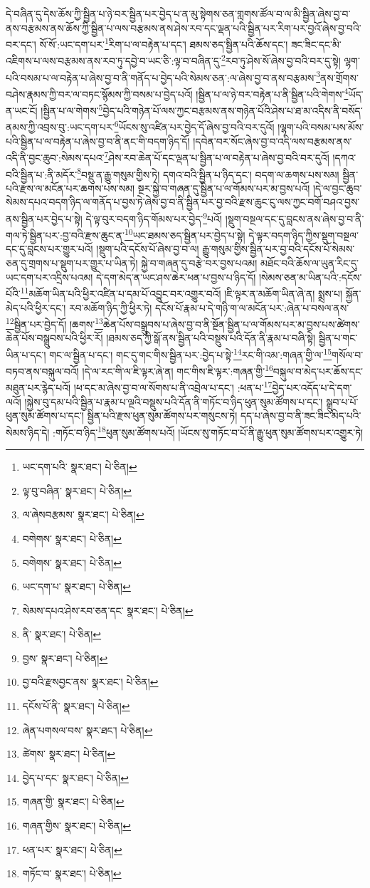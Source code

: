 དེ་བཞིན་དུ་དེས་ཆོས་ཀྱི་སྦྱིན་པ་ཉེ་བར་སྦྱིན་པར་བྱེད་པ་ན་མུ་སྟེགས་ཅན་གླགས་ཚོལ་བ་ལ་མི་སྦྱིན་ཞེས་བྱ་བ་ནས་བརྩམས་ནས་ཆོས་ཀྱི་སྦྱིན་པ་ལས་བརྩམས་ནས་ཤེས་རབ་དང་ལྡན་པའི་སྦྱིན་པར་རིག་པར་བྱའོ་ཞེས་བྱ་བའི་བར་དང་། སོ་སོ་:ཡང་དག་པར་\footnote{ཡང་དག་པའི་  སྣར་ཐང་།  པེ་ཅིན། }རིག་པ་ལ་བརྟེན་པ་དང་། ཐམས་ཅད་སྦྱིན་པའི་ཆོས་དང་། ཟང་ཟིང་དང་མི་འཇིགས་པ་ལས་བརྩམས་ནས་རབ་ཏུ་དབྱེ་བ་ཡང་ཅི་:ལྟ་བ་བཞིན་དུ་\footnote{ལྟ་བུ་བཞིན་  སྣར་ཐང་།  པེ་ཅིན། }རབ་ཏུ་ཤེས་སོ་ཞེས་བྱ་བའི་བར་དུ་སྟེ། ལྷག་པའི་བསམ་པ་ལ་བརྟེན་པ་ཞེས་བྱ་བ་ནི་གནོད་པ་བྱེད་པའི་སེམས་ཅན་:ལ་ཞེས་བྱ་བ་ནས་བརྩམས་\footnote{ལ་ཞེསབརྩམས་  སྣར་ཐང་།  པེ་ཅིན། }ནས་གྲོགས་བཤེས་རྣམས་ཀྱི་བར་ལ་བཏང་སྙོམས་ཀྱི་བསམ་པ་བྱེད་པའོ། །སྦྱིན་པ་ལ་ཉེ་བར་བརྟེན་པ་ནི་སྦྱིན་པའི་གེགས་\footnote{བགེགས་  སྣར་ཐང་།  པེ་ཅིན། }ཡོད་ན་ཡང་ངོ། །སྦྱིན་པ་ལ་གེགས་\footnote{བགེགས་  སྣར་ཐང་།  པེ་ཅིན། }བྱེད་པའི་གཉེན་པོ་ལས་ཀྱང་བརྩམས་ནས་གཉེན་པོའི་ཤེས་པ་ཐ་མ་འདིས་ནི་བསོད་ནམས་ཀྱི་འབྲས་བུ་:ཡང་དག་པར་\footnote{ཡང་དག་པ་  སྣར་ཐང་།  པེ་ཅིན། }ཡོངས་སུ་འཛིན་པར་བྱེད་དོ་ཞེས་བྱ་བའི་བར་དུའོ། །ལྷག་པའི་བསམ་པས་མོས་པའི་སྦྱིན་པ་ལ་བརྟེན་པ་ཞེས་བྱ་བ་ནི་ནང་གི་བདག་ཉིད་དོ། །དབེན་བར་སོང་ཞེས་བྱ་བ་འདི་ལས་བརྩམས་ནས་འདི་ནི་བྱང་ཆུབ་:སེམས་དཔའ་\footnote{སེམས་དཔའ་ཤེས་རབ་ཅན་དང་  སྣར་ཐང་།  པེ་ཅིན། }ཤེས་རབ་ཆེན་པོ་དང་ལྡན་པ་སྦྱིན་པ་ལ་བརྟེན་པ་ཞེས་བྱ་བའི་བར་དུའོ། །དཀའ་བའི་སྦྱིན་པ་:ནི་མདོར་\footnote{ནི་  སྣར་ཐང་།  པེ་ཅིན། }བསྡུ་ན་རྒྱུ་གསུམ་གྱིས་ཏེ། དགའ་བའི་སྦྱིན་པ་ཉིད་དང་། བདག་ལ་ཆགས་པས་སམ། སྦྱིན་པའི་རྫས་ལ་མངོན་པར་ཆགས་པས་སམ། སྔར་སྐྱེ་བ་གཞན་དུ་སྦྱིན་པ་ལ་གོམས་པར་མ་བྱས་པའོ། །དེ་ལ་བྱང་ཆུབ་སེམས་དཔའ་བདག་ཉིད་ལ་གནོད་པ་བྱས་ཏེ་ཞེས་བྱ་བ་ནི་སྦྱིན་པར་བྱ་བའི་རྫས་ཆུང་ངུ་ལས་ཀྱང་བགོ་བཤའ་བྱས་ནས་སྦྱིན་པར་བྱེད་པ་སྟེ། དེ་ལྟ་བུར་བདག་ཉིད་གོམས་པར་བྱེད་\footnote{བྱས་  སྣར་ཐང་།  པེ་ཅིན། }པའོ། །སྡུག་བསྔལ་དང་དུ་བླངས་ནས་ཞེས་བྱ་བ་ནི་གལ་ཏེ་སྦྱིན་པར་:བྱ་བའི་རྫས་ཆུང་ན་\footnote{བྱ་བའི་རྫསབྱང་ནས་  སྣར་ཐང་།  པེ་ཅིན། }ཡང་ཐམས་ཅད་སྦྱིན་པར་བྱེད་པ་སྟེ། དེ་ལྟར་བདག་ཉིད་ཀྱིས་སྡུག་བསྔལ་དང་དུ་བླངས་པར་གྱུར་པའོ། །སྡུག་པའི་དངོས་པོ་ཞེས་བྱ་བ་ལ། རྒྱུ་གསུམ་གྱིས་སྦྱིན་པར་བྱ་བའི་དངོས་པོ་སེམས་ཅན་དུ་གྲགས་པ་སྡུག་པར་གྱུར་པ་ཡིན་ཏེ། སྐྱེ་བ་གཞན་དུ་བརྩེ་བར་བྱས་པའམ། མཐོང་བའི་ཆོས་ལ་ཡུན་རིང་དུ་ཡང་དག་པར་འདྲིས་པའམ། དེ་དག་མེད་ན་ཡང་ཤས་ཆེར་ཕན་པ་བྱས་པ་ཉིད་དོ། །སེམས་ཅན་མ་ཡིན་པའི་:དངོས་པོའི་\footnote{དངོས་པོ་ནི་  སྣར་ཐང་།  པེ་ཅིན། }མཆོག་ཡིན་པའི་ཕྱིར་འཛིན་པ་དམ་པོ་འབྱུང་བར་འགྱུར་བའོ། །ཇི་ལྟར་ན་མཆོག་ཡིན་ཞེ་ན། སྨྲས་པ། སྐྱོན་མེད་པའི་ཕྱིར་དང་། རབ་མཆོག་ཉིད་ཀྱི་ཕྱིར་ཏེ། དངོས་པོ་རྣམ་པ་དེ་གཉི་ག་ལ་མངོན་པར་:ཞེན་པ་བསལ་ནས་\footnote{ཞེན་པགསལ་བས་  སྣར་ཐང་།  པེ་ཅིན། }སྦྱིན་པར་བྱེད་དོ། །ཆགས་\footnote{ཚེགས་  སྣར་ཐང་།  པེ་ཅིན། }ཆེན་པོས་བསྒྲུབས་པ་ཞེས་བྱ་བ་ནི་སྔོན་སྦྱིན་པ་ལ་གོམས་པར་མ་བྱས་པས་ཚེགས་ཆེན་པོས་བསྒྲུབས་པའི་ཕྱིར་རོ། །ཐམས་ཅད་ཀྱི་སྒོ་ནས་སྦྱིན་པའི་བསྡུས་པའི་དོན་ནི་རྣམ་པ་བཞི་སྟེ། སྦྱིན་པ་གང་ཡིན་པ་དང་། གང་ལ་སྦྱིན་པ་དང་། གང་དུ་གང་གིས་སྦྱིན་པར་:བྱེད་པ་སྟེ་\footnote{བྱེད་པ་དང་  སྣར་ཐང་།  པེ་ཅིན། }རང་གི་འམ་:གཞན་གྱི་ལ་\footnote{གཞན་གྱི་  སྣར་ཐང་།  པེ་ཅིན། }གསོལ་བ་བཏབ་ནས་བསྐུལ་བའོ། །དེ་ལ་རང་གི་ལ་ཇི་ལྟར་ཞེ་ན། གང་གིས་ཇི་ལྟར་:གཞན་གྱི་\footnote{གཞན་གྱིས་  སྣར་ཐང་།  པེ་ཅིན། }བསྐུལ་བ་མེད་པར་ཆོས་དང་མཐུན་པར་རྙེད་པའོ། །ཕ་དང་མ་ཞེས་བྱ་བ་ལ་སོགས་པ་ནི་འབྲེལ་པ་དང་། :ཕན་པ་\footnote{ཕན་པར་  སྣར་ཐང་།  པེ་ཅིན། }བྱེད་པར་འདོད་པ་དེ་དག་ལའོ། །སྐྱེས་བུ་དམ་པའི་སྦྱིན་པ་རྣམ་པ་ལྔའི་བསྡུས་པའི་དོན་ནི་གཏོང་བ་ཉིད་ཕུན་སུམ་ཚོགས་པ་དང་། སྒྲུབ་པ་པོ་ཕུན་སུམ་ཚོགས་པ་དང་། སྦྱིན་པའི་རྫས་ཕུན་སུམ་ཚོགས་པར་གསུངས་ཏེ། དད་པ་ཞེས་བྱ་བ་ནི་ཟང་ཟིང་མེད་པའི་སེམས་ཉིད་དེ། :གཏོང་བ་ཉིད་\footnote{གཏོང་བ་  སྣར་ཐང་།  པེ་ཅིན། }ཕུན་སུམ་ཚོགས་པའོ། །ཡོངས་སུ་གཏོང་བ་པོ་ནི་རྒྱུ་ཕུན་སུམ་ཚོགས་པར་འགྱུར་ཏེ། 